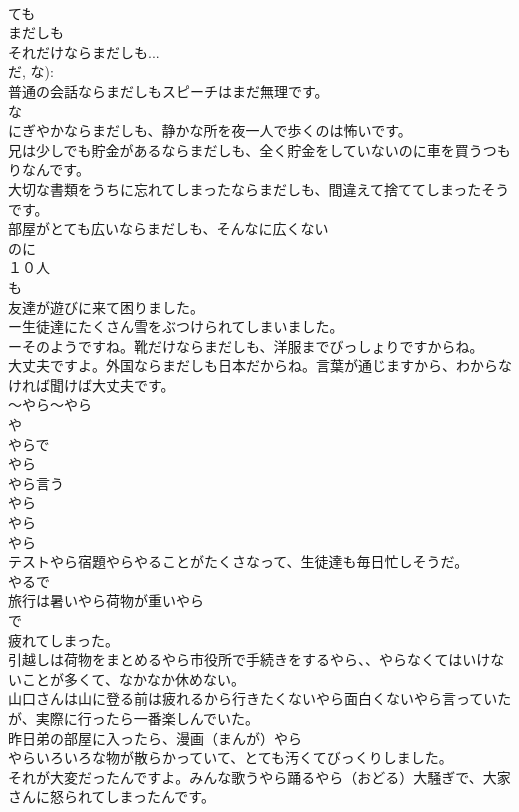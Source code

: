 \documentclass[8pt]{extreport}
\begin{document}
\begin{CJK}{UTF8}{min}
\\	ても 
\\	まだしも
\\	それだけならまだしも...
\\	だ, な):
\\	普通の会話ならまだしもスピーチはまだ無理です。
\\	な
\\	にぎやかならまだしも、静かな所を夜一人で歩くのは怖いです。
\\	兄は少しでも貯金があるならまだしも、全く貯金をしていないのに車を買うつもりなんです。
\\	大切な書類をうちに忘れてしまったならまだしも、間違えて捨ててしまったそうです。
\\	部屋がとても広いならまだしも、そんなに広くない
\\	のに
\\	１０人
\\	も
\\	友達が遊びに来て困りました。
\\	ー生徒達にたくさん雪をぶつけられてしまいました。
\\	ーそのようですね。靴だけならまだしも、洋服までびっしょりですからね。
\\	大丈夫ですよ。外国ならまだしも日本だからね。言葉が通じますから、わからなければ聞けば大丈夫です。	
\\	～やら～やら
\\	や 
\\	やらで
\\	やら
\\	やら言う
\\	やら
\\	やら
\\	やら
\\	テストやら宿題やらやることがたくさなって、生徒達も毎日忙しそうだ。
\\	やるで 
\\	旅行は暑いやら荷物が重いやら
\\	で
\\	疲れてしまった。
\\	引越しは荷物をまとめるやら市役所で手続きをするやら、、やらなくてはいけないことが多くて、なかなか休めない。
\\	山口さんは山に登る前は疲れるから行きたくないやら面白くないやら言っていたが、実際に行ったら一番楽しんでいた。
\\	昨日弟の部屋に入ったら、漫画（まんが）やら
\\	やらいろいろな物が散らかっていて、とても汚くてびっくりしました。
\\	それが大変だったんですよ。みんな歌うやら踊るやら（おどる）大騒ぎで、大家さんに怒られてしまったんです。

\end{CJK}
\end{document}
